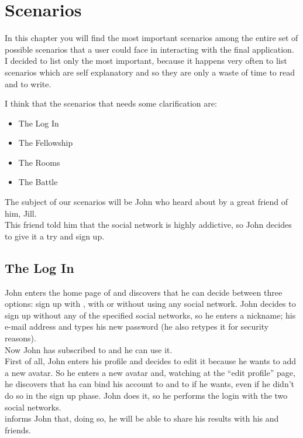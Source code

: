 \chapter{Scenarios}
	In this chapter you will find the most important scenarios among the entire set of possible scenarios that a user could face in interacting with the final application.\\
	I decided to list only the most important, because it happens very often to list scenarios which are self explanatory and so they are only a waste of time to read and to write.

	I think that the scenarios that needs some clarification are:
	\newcommand{\scenarioLogin}{The Log In}
	\newcommand{\scenarioRooms}{The Rooms}
	\newcommand{\scenarioBattle}{The Battle}
	\newcommand{\scenarioFellowship}{The Fellowship}
	\begin{itemize}
		\item \scenarioLogin 
		\item \scenarioFellowship
		\item \scenarioRooms 
		\item \scenarioBattle
	\end{itemize}

	The subject of our scenarios will be John who heard about \SocialBattle{} by a great friend of him, Jill.\\
	This friend told him that the social network is highly addictive, so John decides to give it a try and sign up.

	\section{\scenarioLogin}
		John enters the home page of \SocialBattle{} and discovers that he can decide between three options:
		sign up with \Facebook, with \Twitter or without using any social network.
		John decides to sign up without any of the specified social networks, so he enters a nickname; his e-mail address and types his new password (he also retypes it for security reasons).\\
		Now John has subscribed to \SocialBattle{} and he can use it.\\
		First of all, John enters his profile and decides to edit it because he wants to add a new avatar. So he enters a new avatar and, watching at the ``edit profile'' page, he discovers that ha can bind his account to \Facebook{} and to \Twitter{} if he wants, even if he didn't do so in the sign up phase. John does it, so he performs the login with the two social networks.\\
		\SocialBattle{} informs John that, doing so, he will be able to share his results with his \Facebook{} and \Twitter{} friends.

